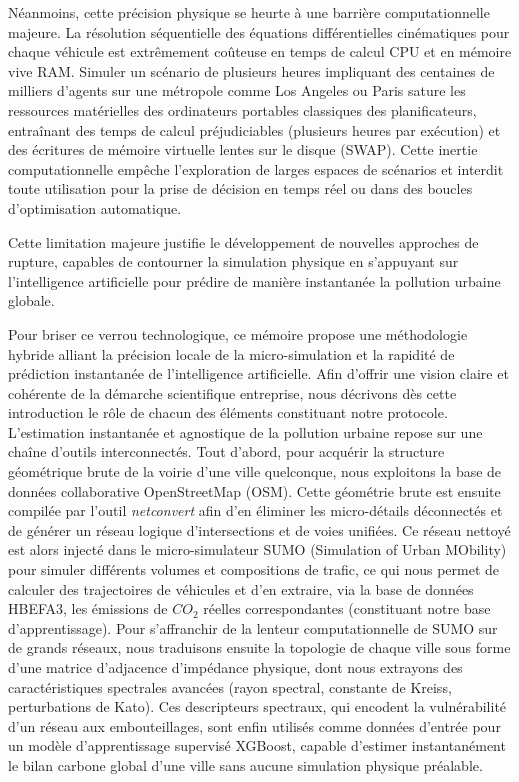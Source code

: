 \documentclass[10pt, a4paper]{article}
\begin{document}
Néanmoins, cette précision physique se heurte à une barrière
computationnelle majeure. La résolution séquentielle des équations
différentielles cinématiques pour chaque véhicule est extrêmement
coûteuse en temps de calcul CPU et en mémoire vive RAM. Simuler un
scénario de plusieurs heures impliquant des centaines de milliers
d'agents sur une métropole comme Los Angeles ou Paris sature les
ressources matérielles des ordinateurs portables classiques des
planificateurs, entraînant des temps de calcul préjudiciables (plusieurs
heures par exécution) et des écritures de mémoire virtuelle lentes sur
le disque (SWAP). Cette inertie computationnelle empêche l'exploration
de larges espaces de scénarios et interdit toute utilisation pour la
prise de décision en temps réel ou dans des boucles d'optimisation
automatique.

Cette limitation majeure justifie le développement de nouvelles
approches de rupture, capables de contourner la simulation physique en
s'appuyant sur l'intelligence artificielle pour prédire de manière
instantanée la pollution urbaine globale.

Pour briser ce verrou technologique, ce mémoire propose une méthodologie
hybride alliant la précision locale de la micro-simulation et la
rapidité de prédiction instantanée de l'intelligence artificielle. Afin
d'offrir une vision claire et cohérente de la démarche scientifique
entreprise, nous décrivons dès cette introduction le rôle de chacun des
éléments constituant notre protocole. L'estimation instantanée et
agnostique de la pollution urbaine repose sur une chaîne d'outils
interconnectés. Tout d'abord, pour acquérir la structure géométrique
brute de la voirie d'une ville quelconque, nous exploitons la base de
données collaborative OpenStreetMap (OSM). Cette géométrie brute est
ensuite compilée par l'outil \emph{netconvert} afin d'en éliminer les
micro-détails déconnectés et de générer un réseau logique
d'intersections et de voies unifiées. Ce réseau nettoyé est alors
injecté dans le micro-simulateur SUMO (Simulation of Urban MObility)
pour simuler différents volumes et compositions de trafic, ce qui nous
permet de calculer des trajectoires de véhicules et d'en extraire, via
la base de données HBEFA3, les émissions de \(CO_2\) réelles
correspondantes (constituant notre base d'apprentissage). Pour
s'affranchir de la lenteur computationnelle de SUMO sur de grands
réseaux, nous traduisons ensuite la topologie de chaque ville sous forme
d'une matrice d'adjacence d'impédance physique, dont nous extrayons des
caractéristiques spectrales avancées (rayon spectral, constante de
Kreiss, perturbations de Kato). Ces descripteurs spectraux, qui encodent
la vulnérabilité d'un réseau aux embouteillages, sont enfin utilisés
comme données d'entrée pour un modèle d'apprentissage supervisé XGBoost,
capable d'estimer instantanément le bilan carbone global d'une ville
sans aucune simulation physique préalable.
\end{document}
